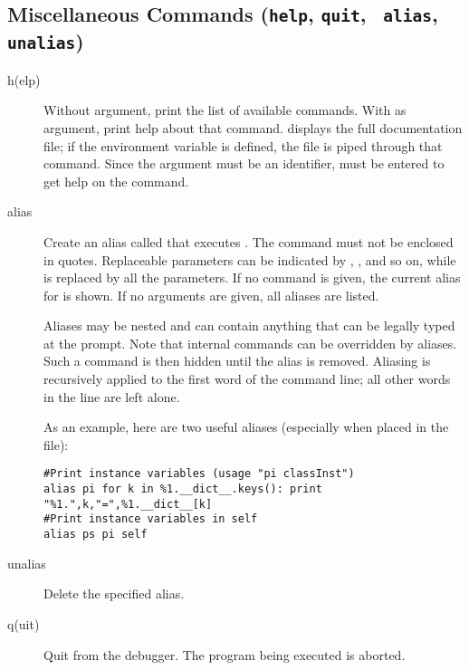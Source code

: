 \subsection{Miscellaneous Commands ({\tt help}, {\tt quit}, {\tt
    alias}, {\tt unalias})\label{subsection-misc}}

\begin{description}

\item[h(elp) ]

Without argument, print the list of available commands.  With
 as argument, print help about that command.   displays the full documentation file; if the environment
variable  is defined, the file is piped through that
command.  Since the  argument must be an identifier,
 must be entered to get help on the \samp{!} command.

\item[alias ]\label{command:aliases}

Create an alias called  that executes .  The
command must not be enclosed in quotes.  Replaceable parameters
can be indicated by , , and so on, while \samp{\%*} is
replaced by all the parameters.  If no command is given, the current
alias for  is shown. If no arguments are given, all
aliases are listed.

Aliases may be nested and can contain anything that can be legally
typed at the  prompt.  Note that internal 
commands can be overridden by aliases.  Such a command is then hidden
until the alias is removed.  Aliasing is recursively applied to the
first word of the command line; all other words in the line are left
alone.

As an example, here are two useful aliases (especially when placed
in the  file):

\begin{verbatim}
#Print instance variables (usage "pi classInst")
alias pi for k in %1.__dict__.keys(): print "%1.",k,"=",%1.__dict__[k]
#Print instance variables in self
alias ps pi self
\end{verbatim}
                
\item[unalias ]

Delete the specified alias.

\item[q(uit)]

Quit from the debugger.
The program being executed is aborted.

\end{description}

